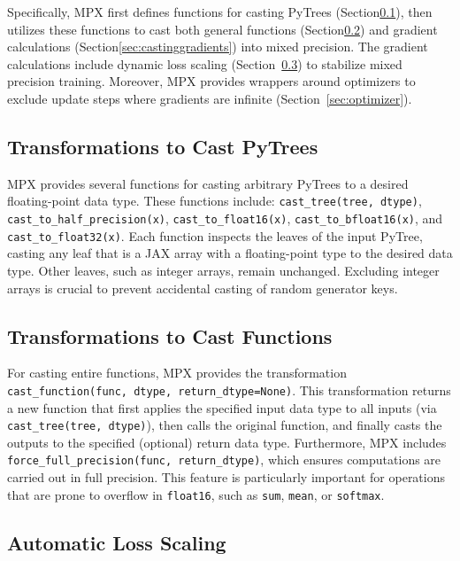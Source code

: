 \documentclass[10pt, a4paper, logo, onecolumn, internal, copyright]{dsme}
\newcommand{\mpx}{\textsc{MPX}}
\begin{document}
Specifically, \mpx{} first defines functions for casting PyTrees (Section\ref{sec:castingpytrees}), then utilizes these functions to cast both general functions (Section\ref{sec:castingfunctions}) and gradient calculations (Section\ref{sec:castinggradients}) into mixed precision. 
The gradient calculations include dynamic loss scaling (Section~\ref{sec:scaling}) to stabilize mixed precision training.
Moreover, \mpx{} provides wrappers around optimizers to exclude update steps where gradients are infinite (Section~\ref{sec:optimizer}).

\subsection{Transformations to Cast PyTrees}
\label{sec:castingpytrees}

\mpx{} provides several functions for casting arbitrary PyTrees to a desired floating-point data type. These functions include:
\texttt{cast\_tree(tree, dtype)}, \texttt{cast\_to\_half\_precision(x)}, \texttt{cast\_to\_float16(x)}, \texttt{cast\_to\_bfloat16(x)}, and \texttt{cast\_to\_float32(x)}. 
Each function inspects the leaves of the input PyTree, casting any leaf that is a JAX array with a floating-point type to the desired data type. 
Other leaves, such as integer arrays, remain unchanged. 
Excluding integer arrays is crucial to prevent accidental casting of random generator keys.

\subsection{Transformations to Cast Functions}
\label{sec:castingfunctions}

For casting entire functions, \mpx{} provides the transformation \texttt{cast\_function(func, dtype, return\_dtype=None)}. 
This transformation returns a new function that first applies the specified input data type to all inputs (via \texttt{cast\_tree(tree, dtype)}), then calls the original function, and finally casts the outputs to the specified (optional) return data type. 
Furthermore, \mpx{} includes \texttt{force\_full\_precision(func, return\_dtype)}, which ensures computations are carried out in full precision. 
This feature is particularly important for operations that are prone to overflow in \texttt{float16}, such as \texttt{sum}, \texttt{mean}, or \texttt{softmax}.


\subsection{Automatic Loss Scaling}
\label{sec:scaling}
\end{document}
